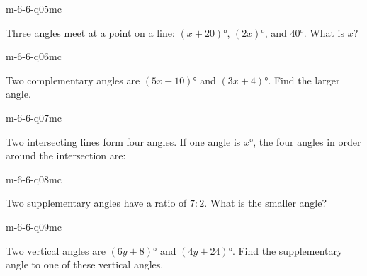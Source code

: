 \begin{practiceQuestion}{m-6-6-q05}{mc}
\begin{questionText}
Three angles meet at a point on a line: $(x + 20)°$, $(2x)°$, and $40°$. What is $x$?
\end{questionText}
\end{practiceQuestion}

\begin{practiceQuestion}{m-6-6-q06}{mc}
\begin{questionText}
Two complementary angles are $(5x - 10)°$ and $(3x + 4)°$. Find the larger angle.
\end{questionText}
\end{practiceQuestion}

\begin{practiceQuestion}{m-6-6-q07}{mc}
\begin{questionText}
Two intersecting lines form four angles. If one angle is $x°$, the four angles in order around the intersection are:
\end{questionText}
\end{practiceQuestion}

\begin{practiceQuestion}{m-6-6-q08}{mc}
\begin{questionText}
Two supplementary angles have a ratio of $7:2$. What is the smaller angle?
\end{questionText}
\end{practiceQuestion}

\begin{practiceQuestion}{m-6-6-q09}{mc}
\begin{questionText}
Two vertical angles are $(6y + 8)°$ and $(4y + 24)°$. Find the supplementary angle to one of these vertical angles.
\end{questionText}
\end{practiceQuestion}

